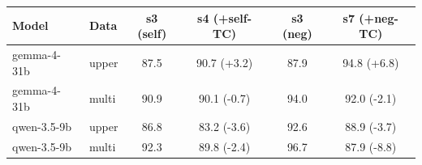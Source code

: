 \begin{tabular}{llcccc}
\toprule
Model & Data & s3 (self) & s4 (+self-TC) & s3 (neg) & s7 (+neg-TC) \\
\midrule
gemma-4-31b & upper & 87.5 & 90.7 (+3.2) & 87.9 & 94.8 (+6.8) \\
gemma-4-31b & multi & 90.9 & 90.1 (-0.7) & 94.0 & 92.0 (-2.1) \\
\midrule
qwen-3.5-9b & upper & 86.8 & 83.2 (-3.6) & 92.6 & 88.9 (-3.7) \\
qwen-3.5-9b & multi & 92.3 & 89.8 (-2.4) & 96.7 & 87.9 (-8.8) \\
\bottomrule
\end{tabular}
